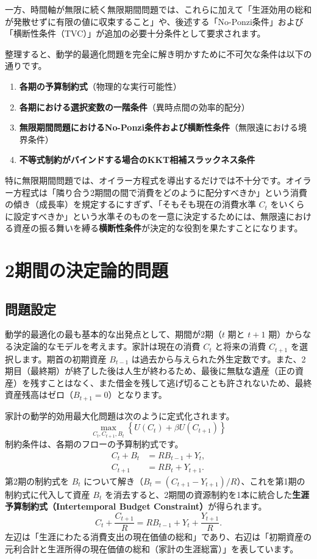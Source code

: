 \documentclass[
  japanese,
  lualatex,
  ja=standard,
  12pt,
  a4paper]{ltjsarticle}
\providecommand{\tightlist}{%
  \setlength{\itemsep}{0pt}\setlength{\parskip}{0pt}}
\begin{document}
一方、時間軸が無限に続く無限期間問題では、これらに加えて「生涯効用の総和が発散せずに有限の値に収束すること」や、後述する「No-Ponzi条件」および「横断性条件（TVC）」が追加の必要十分条件として要求されます。

整理すると、動学的最適化問題を完全に解き明かすために不可欠な条件は以下の通りです。

\begin{enumerate}
\def\labelenumi{\arabic{enumi}.}
\tightlist
\item
  \textbf{各期の予算制約式}（物理的な実行可能性）
\item
  \textbf{各期における選択変数の一階条件}（異時点間の効率的配分）
\item
  \textbf{無限期間問題におけるNo-Ponzi条件および横断性条件}（無限遠における境界条件）
\item
  \textbf{不等式制約がバインドする場合のKKT相補スラックネス条件}
\end{enumerate}

特に無限期間問題では、オイラー方程式を導出するだけでは不十分です。オイラー方程式は「隣り合う2期間の間で消費をどのように配分すべきか」という消費の傾き（成長率）を規定するにすぎず、「そもそも現在の消費水準
\(C_t\)
をいくらに設定すべきか」という水準そのものを一意に決定するためには、無限遠における資産の振る舞いを縛る\textbf{横断性条件}が決定的な役割を果たすことになります。

\section{2期間の決定論的問題}\label{ux671fux9593ux306eux6c7aux5b9aux8ad6ux7684ux554fux984c}

\subsection{問題設定}\label{ux554fux984cux8a2dux5b9a}

動学的最適化の最も基本的な出発点として、期間が2期（\(t\) 期と \(t+1\)
期）からなる決定論的なモデルを考えます。家計は現在の消費 \(C_t\)
と将来の消費 \(C_{t+1}\) を選択します。期首の初期資産 \(B_{t-1}\)
は過去から与えられた外生定数です。また、2期目（最終期）が終了した後は人生が終わるため、最後に無駄な遺産（正の資産）を残すことはなく、また借金を残して逃げ切ることも許されないため、最終資産残高はゼロ（\(B_{t+1} = 0\)）となります。

家計の動学的効用最大化問題は次のように定式化されます。 \[
\max_{C_t, C_{t+1}, B_t} \left\{ U(C_t) + \beta U(C_{t+1}) \right\}
\] 制約条件は、各期のフローの予算制約式です。 \[
\begin{aligned}
C_t + B_t &= R B_{t-1} + Y_t,\\
C_{t+1} &= R B_t + Y_{t+1}.
\end{aligned}
\] 第2期の制約式を \(B_t\)
について解き（\(B_t = (C_{t+1} - Y_{t+1})/R\)）、これを第1期の制約式に代入して資産
\(B_t\)
を消去すると、2期間の資源制約を1本に統合した\textbf{生涯予算制約式（Intertemporal
Budget Constraint）}が得られます。 \[
C_t + \frac{C_{t+1}}{R} = R B_{t-1} + Y_t + \frac{Y_{t+1}}{R}.
\]
左辺は「生涯にわたる消費支出の現在価値の総和」であり、右辺は「初期資産の元利合計と生涯所得の現在価値の総和（家計の生涯総富）」を表しています。
\end{document}
